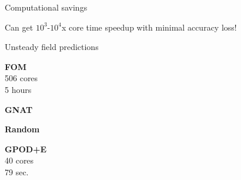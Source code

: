 \documentclass[]{beamer}
\begin{document}
\begin{frame}{Computational savings}
    \begin{figure}
	\end{figure}
	\begin{tcolorbox}[colframe=blue!50!white,halign=center]
		Can get $10^3\text{-}10^4$x core time speedup with minimal accuracy loss!
	\end{tcolorbox}
\end{frame}

\begin{frame}{Unsteady field predictions}
	\begin{minipage}{0.13\linewidth}
		\centering

		\footnotesize
		\textbf{FOM}\\
		506 cores\\
		5 hours
		\normalsize

		\vspace{2em}

		\footnotesize
		\textbf{GNAT}
		\normalsize

		\vspace{2.5em}

		\footnotesize
		\textbf{Random}
		\normalsize

		\vspace{2.5em}

		\footnotesize
		\textbf{GPOD+E}\\
		40 cores\\
		79 sec.
		\normalsize

	\end{minipage}\hspace{0.4em}
	\begin{minipage}{0.84\linewidth}
		\begin{figure}
		\end{figure}
	\end{minipage}
\end{frame}
\end{document}
